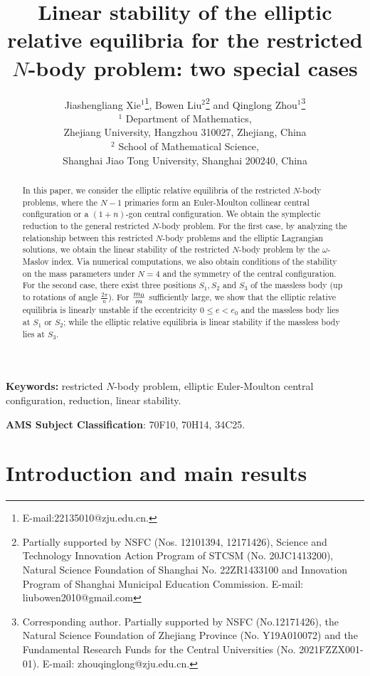 \documentclass[11pt]{article}
\title{Linear stability of the elliptic relative equilibria for the restricted $N$-body problem: two special cases}
\author{Jiashengliang Xie$^{1}$\thanks{E-mail:22135010@zju.edu.cn.},\quad
	Bowen Liu$^{2}$\thanks{Partially supported by NSFC (Nos. {12101394,  12171426}), Science and Technology Innovation Action Program of  STCSM (No. 20JC1413200), Natural Science Foundation of Shanghai No. 22ZR1433100	and Innovation Program of Shanghai Municipal Education Commission. E-mail: liubowen2010@gmail.com} \quad and \quad
	Qinglong Zhou$^{1}$\thanks{Corresponding author. Partially supported by NSFC (No.12171426), the Natural Science Foundation of Zhejiang Province (No. Y19A010072) and the Fundamental Research Funds for the Central Universities (No. 2021FZZX001-01).
		E-mail: zhouqinglong@zju.edu.cn. }\\	
	$^{1}$ Department of Mathematics,\\Zhejiang University, Hangzhou 310027, Zhejiang, China\\
	$^{2}$ School of Mathematical Science,\\ Shanghai Jiao Tong University, Shanghai 200240, China\\
}
\def\om{{\omega}}
\begin{document}
\maketitle


\begin{abstract}
In this paper, we consider the elliptic relative equilibria of the restricted $N$-body problems, where
the $N-1$ primaries form an Euler-Moulton collinear central configuration 
or a $(1+n)$-gon central configuration. 
We obtain the symplectic reduction to the general restricted $N$-body problem. 
For the first case,
by analyzing the relationship between this restricted $N$-body problems and the elliptic Lagrangian solutions, we obtain the linear stability of the restricted $N$-body problem by the $\om$-Maslov index. Via numerical computations, we also obtain conditions of the stability on the mass parameters under $N=4$ and the symmetry of the central configuration.
For the second case,
there exist three positions
$S_1,S_2$ and $S_3$
of the massless body (up to rotations of angle $\frac{2\pi}{n}$).
For ${m_0\over m}$ sufficiently large,
we show that the elliptic relative equilibria
is linearly unstable if the eccentricity $0\le e<e_0$ and the massless body lies at $S_1$ or $S_2$;
while the elliptic relative equilibria
is linear stability if the massless body lies at $S_3$.
\end{abstract}

{\bf Keywords:} restricted $N$-body problem, elliptic Euler-Moulton central configuration, reduction, linear stability.

{\bf AMS Subject Classification}: 70F10, 70H14, 34C25.


\renewcommand{\theequation}{\thesection.\arabic{equation}}


\setcounter{equation}{0}%
\section{Introduction and main results}%
\label{sec:1}
\end{document}
